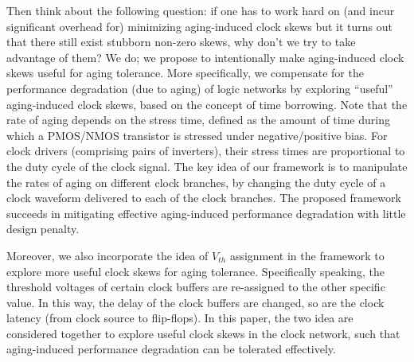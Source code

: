 Then think about the following question: if one has to work hard on (and incur significant overhead for) minimizing aging-induced clock skews but it turns out that there still exist stubborn non-zero skews, why don't we try to take advantage of them? We do; we propose to intentionally make aging-induced clock skews useful for aging tolerance. More specifically, we compensate for the performance degradation (due to aging) of logic networks by exploring \enquote{useful} aging-induced clock skews, based on the concept of time borrowing. Note that the rate of aging depends on the stress time, defined as the amount of time during which a PMOS/NMOS transistor is stressed under negative/positive bias. For clock drivers (comprising pairs of inverters), their stress times are proportional to the duty cycle of the clock signal. The key idea of our framework is to manipulate the rates of aging on different clock branches, by changing the duty cycle of a clock waveform delivered to each of the clock branches. The proposed framework succeeds in mitigating effective aging-induced performance degradation with little design penalty.

Moreover, we also incorporate the idea of $V_{th}$ assignment in the framework to explore more useful clock skews for aging tolerance. Specifically speaking, the threshold voltages of certain clock buffers are re-assigned to the other specific value. In this way, the delay of the clock buffers are changed, so are the clock latency (from clock source to flip-flops). In this paper, the two idea are considered together to explore useful clock skews in the clock network, such that aging-induced performance degradation can be tolerated effectively.